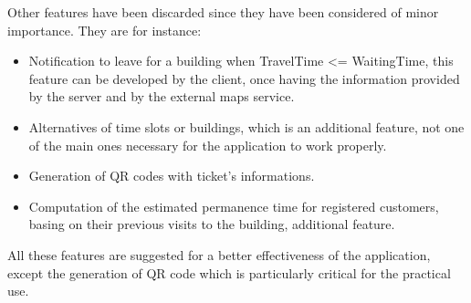 Other features have been discarded since they have been considered of minor importance. They are for instance:
\begin{itemize}
	\item Notification to leave for a building when TravelTime <= WaitingTime, this feature can be developed by the client, once having the information provided by the server and by the external maps service.
	\item Alternatives of time slots or buildings, which is an additional feature, not one of the main ones necessary for the application to work properly. 
	\item Generation of QR codes with ticket's informations.
	\item Computation of the estimated permanence time for registered customers, basing on their previous visits to the building, additional feature.
\end{itemize}
All these features are suggested for a better effectiveness of the application, except the generation of QR code which is particularly critical for the practical use.